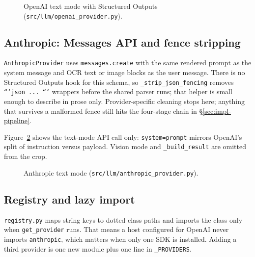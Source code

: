 \begin{figure}[ht]
    \centering
    \caption{OpenAI text mode with Structured Outputs
    (\texttt{src/llm/openai\_provider.py}).}
    \label{fig:impl-openai-text}
\end{figure}


\subsection{Anthropic: Messages API and fence stripping}

\texttt{AnthropicProvider} uses \texttt{messages.create} with the
same rendered prompt as the system message and OCR text or image
blocks as the user message. There is no Structured Outputs hook
for this schema, so \texttt{\_strip\_json\_fencing} removes
\texttt{```json ... ```} wrappers before the shared parser runs;
that helper is small enough to describe in prose only. Provider-specific
cleaning stops here; anything that survives a malformed fence still
hits the four-stage chain in \S\ref{sec:impl-pipeline}.

Figure~\ref{fig:impl-anthropic-text} shows the text-mode API call only:
\texttt{system=prompt} mirrors OpenAI's split of instruction versus
payload. Vision mode and \texttt{\_build\_result} are omitted from the
crop.

\begin{figure}[ht]
    \centering
    \caption{Anthropic text mode (\texttt{src/llm/anthropic\_provider.py}).}
    \label{fig:impl-anthropic-text}
\end{figure}


\subsection{Registry and lazy import}

\texttt{registry.py} maps string keys to dotted class paths and
imports the class only when \texttt{get\_provider} runs. That means
a host configured for OpenAI never imports \texttt{anthropic}, which
matters when only one SDK is installed. Adding a third provider is
one new module plus one line in \texttt{\_PROVIDERS}.

